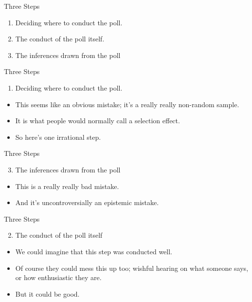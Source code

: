 \documentclass[
  17pt,
  letterpaper,
  ignorenonframetext,
  aspectratio=169,
  xcolor={dvipsnames}]{beamer}
\providecommand{\tightlist}{%
  \setlength{\itemsep}{0pt}\setlength{\parskip}{0pt}}\usepackage{longtable,booktabs,array}
\begin{document}
\begin{frame}{Three Steps}
\protect\hypertarget{three-steps}{}
\begin{enumerate}[<+->]
\tightlist
\item
  Deciding where to conduct the poll.
\item
  The conduct of the poll itself.
\item
  The inferences drawn from the poll
\end{enumerate}
\end{frame}

\begin{frame}{Three Steps}
\protect\hypertarget{three-steps-1}{}
\begin{enumerate}[<+->]
\tightlist
\item
  Deciding where to conduct the poll.
\end{enumerate}

\begin{itemize}[<+->]
\tightlist
\item
  This seems like an obvious mistake; it's a really really non-random
  sample.
\item
  It is what people would normally call a selection effect.
\item
  So here's one irrational step.
\end{itemize}
\end{frame}

\begin{frame}{Three Steps}
\protect\hypertarget{three-steps-2}{}
\begin{enumerate}[<+->]
\setcounter{enumi}{2}
\tightlist
\item
  The inferences drawn from the poll
\end{enumerate}

\begin{itemize}[<+->]
\tightlist
\item
  This is a really really bad mistake.
\item
  And it's uncontroversially an epistemic mistake.
\end{itemize}
\end{frame}

\begin{frame}{Three Steps}
\protect\hypertarget{three-steps-3}{}
\begin{enumerate}[<+->]
\setcounter{enumi}{1}
\tightlist
\item
  The conduct of the poll itself
\end{enumerate}

\begin{itemize}[<+->]
\tightlist
\item
  We could imagine that this step was conducted well.
\item
  Of course they could mess this up too; wishful hearing on what someone
  says, or how enthusiastic they are.
\item
  But it could be good.
\end{itemize}
\end{frame}
\end{document}
